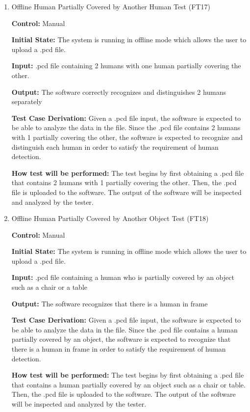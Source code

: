 \documentclass[12pt, titlepage]{article}
\begin{document}
\begin{enumerate}
\item{Offline Human Partially Covered by Another Human Test (FT17)\label{FT17}\\}

\textbf{Control:} Manual

\textbf{Initial State:} The system is running in offline mode which allows the user to upload a .pcd file.

\textbf{Input:} .pcd file containing 2 humans with one human partially covering the other.

\textbf{Output:} The software correctly recognizes and distinguishes 2 humans separately

\textbf{Test Case Derivation:} Given a .pcd file input, the software is expected to be able to analyze the data in the file. Since the .pcd file contains 2 humans with 1 partially covering the other, the software is expected to recognize and distinguish each human in order to satisfy the requirement of human detection.

\textbf{How test will be performed:} The test begins by first obtaining a .pcd file that contains 2 humans with 1 partially covering the other. Then, the .pcd file is uploaded to the software. The output of the software will be inspected and analyzed by the tester.

\item{Offline Human Partially Covered by Another Object Test (FT18)\label{FT18}\\}

\textbf{Control:} Manual

\textbf{Initial State:} The system is running in offline mode which allows the user to upload a .pcd file.

\textbf{Input:} .pcd file containing a human who is partially covered by an object such as a chair or a table

\textbf{Output:} The software recognizes that there is a human in frame

\textbf{Test Case Derivation:} Given a .pcd file input, the software is expected to be able to analyze the data in the file. Since the .pcd file contains a human partially covered by an object, the software is expected to recognize that there is a human in frame in order to satisfy the requirement of human detection.

\textbf{How test will be performed:} The test begins by first obtaining a .pcd file that contains a human partially covered by an object such as a chair or table. Then, the .pcd file is uploaded to the software. The output of the software will be inspected and analyzed by the tester.

\end{enumerate} 
\end{document}

